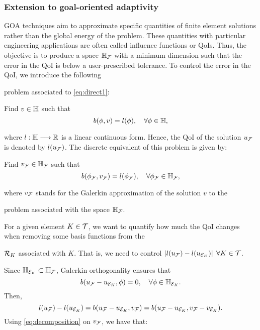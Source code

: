 {{{{{\subsubsection{Extension to goal-oriented adaptivity}
GOA techniques aim to approximate specific quantities of finite element solutions rather than the global energy of the problem. These quantities with particular engineering applications are often called influence functions or QoIs. Thus, the objective is to produce a space $\mathbb{H}_{\mathcal{F}}$ with a minimum dimension such that the error in the QoI is below a user-prescribed tolerance. To control the error in the QoI, we introduce the following { problem \cite{prudhomme1999goal,oden2001goal} associated to \cref{eq:direct1}:
\begin{var_for}
  Find $v \in \mathbb{H}$ such that
  \begin{equation}
    \label{eq:adjoint}
    b(\phi,v)=l(\phi), \quad \forall \phi\in \mathbb{H},
  \end{equation}
\end{var_for}
\noindent where $l: \mathbb{H} \longrightarrow \mathbb{R}$ is a linear continuous form. Hence, the QoI of the solution $u_{\mathcal{F}}$ is denoted by $l(u_{\mathcal{F}})$. The discrete equivalent of this problem is given by:
\begin{var_for}
  Find $v_{\mathcal{F}}\in \mathbb{H}_{\mathcal{F}}$ such that
  \begin{equation}
    \label{eq:adjointH}
    b(\phi_{\mathcal{F}},v_{\mathcal{F}})=l(\phi_{\mathcal{F}}), \quad \forall \phi_{\mathcal{F}} \in \mathbb{H}_{\mathcal{F}},
  \end{equation}
\end{var_for}
\noindent  where $v_{\mathcal{F}}$ stands for the Galerkin approximation of the solution $v$ to the { problem associated with the space $\mathbb{H}_{\mathcal{F}}$. {

For a given element $K \in \mathcal{T}$, we want to quantify how much the QoI changes when removing some basis functions from the { $\mathcal{R}_K$ associated with $K$. That is, we need to control $\left|l(u_{\mathcal{F}})-l(u_{\mathcal{E}_K})\right| \; \forall K\in \mathcal{T}$.


Since $\mathbb{H}_{\mathcal{E}_K} \subset \mathbb{H}_{\mathcal{F}}$, Galerkin orthogonality ensures that
\begin{equation}
  b(u_{\mathcal{F}}-u_{\mathcal{E}_K}, \phi)=0, \quad \forall \phi \in \mathbb{H}_{\mathcal{E}_K}.
\end{equation}
Then,
\begin{equation}
  l(u_{\mathcal{F}})-l(u_{\mathcal{E}_K})  = b(u_{\mathcal{F}}-u_{\mathcal{E}_K},v_{\mathcal{F}})  = b(u_{\mathcal{F}}-u_{\mathcal{E}_K},v_{\mathcal{F}}-v_{\mathcal{E}_K}).
\end{equation}
Using \cref{eq:decomposition} on $v_{\mathcal{F}}$, we have that:

}}}}}}}}}
